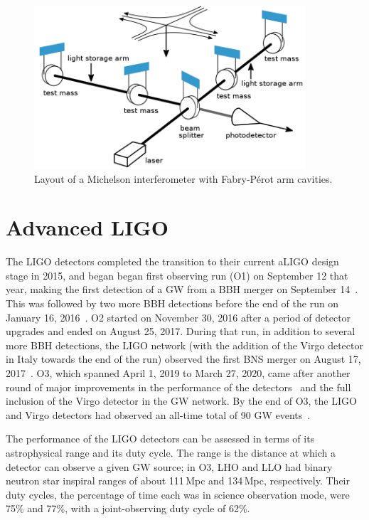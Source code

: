 \begin{figure}[htb]
  \centering
  \includegraphics[width=0.9\textwidth]{figures/detectors/basic.png}
  \caption{Layout of a Michelson interferometer with Fabry-P\'erot arm cavities.}%
  \label{fig:detectors-basic}
\end{figure}


\section{Advanced LIGO}

The LIGO detectors completed the transition to their current \ac{aLIGO} design stage in 2015, and began began first observing run (\acs{O1}) on September 12 that year, making the first detection of a \ac{GW} from a \ac{BBH} merger on September 14~\citep{gw150914}.
This was followed by two more \ac{BBH} detections before the end of the run on January 16, 2016~\citep{gwtc1}.
\Ac{O2} started on November 30, 2016 after a period of detector upgrades and ended on August 25, 2017.
During that run, in addition to several more \ac{BBH} detections, the \ac{LIGO} network (with the addition of the Virgo detector in Italy towards the end of the run) observed the first \ac{BNS} merger on August 17, 2017~\citep{gw170817}.
\Ac{O3}, which spanned April 1, 2019 to March 27, 2020, came after another round of major improvements in the performance of the detectors~\citep{Buikema_2020} and the full inclusion of the Virgo detector in the \ac{GW} network.
By the end of O3, the LIGO and Virgo detectors had observed an all-time total of 90 GW events~\citep{gwtc2,gwtc3}.

The performance of the LIGO detectors can be assessed in terms of its astrophysical range and its duty cycle.
The range is the distance at which a detector can observe a given GW source; in O3, LHO and LLO had binary neutron star inspiral ranges of about 111\,Mpc and 134\,Mpc, respectively.
Their duty cycles, the percentage of time each was in science observation mode, were 75\% and 77\%, with a joint-observing duty cycle of 62\%.

